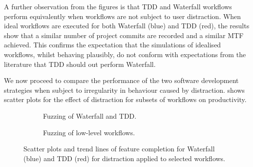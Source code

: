 \documentclass{llncs}
\begin{document}
A further observation from the figures is that TDD and Waterfall workflows perform equivalently when workflows are not
subject to user distraction.  When ideal workflows are executed for both Waterfall (blue) and TDD (red), the results
show that a similar number of project commits are recorded and a similar MTF achieved.  This confirms the expectation
that the simulations of idealised workflows, whilst behaving plausibly, do not conform with expectations from the
literature that TDD should out perform Waterfall.

We now proceed to compare the performance of the two software development strategies when subject to irregularity in
behaviour caused by distraction.  shows scatter plots for the effect of distraction for
subsets of workflows on productivity.%
\begin{figure}[t]
  \centering
  \hfill
  \begin{subfigure}[t]{2.3in}%
    \caption{Fuzzing of Waterfall and TDD.}
    \label{fig:fuzzing-features:WF}
  \end{subfigure}
  \hfill
  \begin{subfigure}[t]{2.3in}
    \caption{Fuzzing of low-level workflows.}  
  \label{fig:fuzzing-features:CTIDR}
  \end{subfigure}
  \hfill

  \caption{Scatter plots and trend lines of feature completion for Waterfall (blue) and TDD (red) for distraction
    applied to selected workflows.}
  \label{fig:fuzzing-features}
\end{figure}
\end{document}
